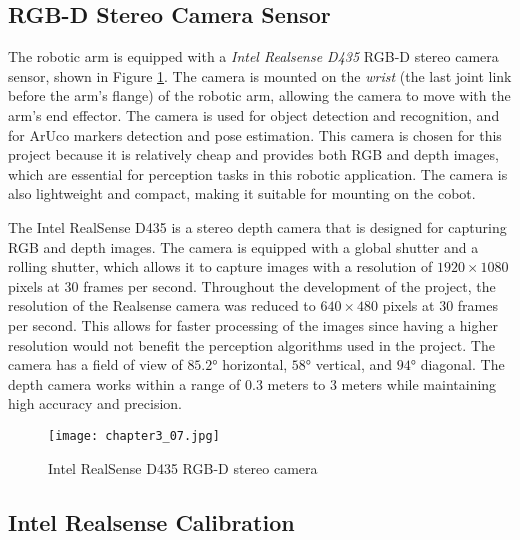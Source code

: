 \subsection{RGB-D Stereo Camera Sensor}

The robotic arm is equipped with a \textit{Intel Realsense D435} RGB-D stereo camera sensor, shown in Figure \ref{fig:c3_img07}.
The camera is mounted on the \textit{wrist} (the last joint link before the arm's flange) of the robotic arm,
allowing the camera to move with the arm's end effector.
The camera is used for object detection and recognition, and for ArUco markers detection and pose estimation.
This camera is chosen for this project because it is relatively cheap and provides both RGB and depth images,
which are essential for perception tasks in this robotic application.
The camera is also lightweight and compact, making it suitable for mounting on the cobot.

The Intel RealSense D435 is a stereo depth camera that is designed for capturing RGB and depth images.
The camera is equipped with a global shutter and a rolling shutter, which allows it to capture images with a resolution
of $1920\times1080$ pixels at $30$ frames per second. Throughout the development of the project,
the resolution of the Realsense camera was reduced to $640\times480$ pixels at $30$ frames per second. 
This allows for faster processing of the images since having a higher resolution would not benefit the perception
algorithms used in the project.
The camera has a field of view of $85.2$° horizontal, $58$° vertical,
and $94$° diagonal. The depth camera works within a range of $0.3$ meters to $3$ meters while maintaining 
high accuracy and precision.

\begin{figure}[t]
    \centering
    \texttt{[image: chapter3\_07.jpg]}
    \captionsetup{width=1\linewidth}
    \caption{Intel RealSense D435 RGB-D stereo camera}
    \label{fig:c3_img07}
\end{figure}

\subsection{Intel Realsense Calibration}

